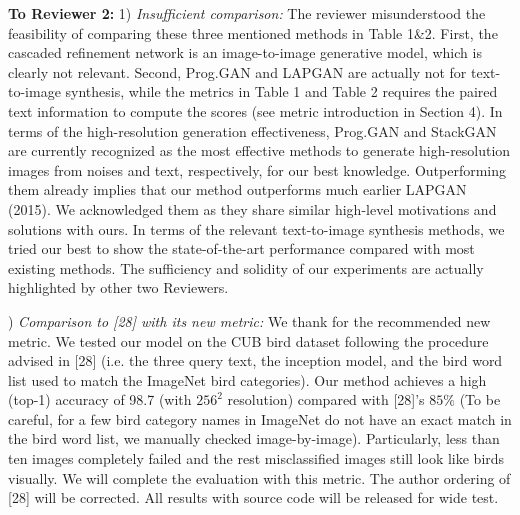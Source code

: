 \documentclass[10pt,twocolumn,letterpaper]{article}
\begin{document}
\noindent
\textbf{To Reviewer 2:} 1) \textit{Insufficient comparison: } The reviewer misunderstood the feasibility of comparing these three mentioned methods in Table 1\&2. First, the cascaded refinement network is an image-to-image generative model, which is clearly not relevant.  
Second, Prog.GAN and LAPGAN are actually not for text-to-image synthesis, while the metrics in Table 1 and Table 2 requires the paired text information to compute the scores (see metric introduction in Section 4).
In terms of the high-resolution generation effectiveness, 
Prog.GAN and StackGAN are currently recognized as the most effective methods to generate high-resolution images from noises and text, respectively, for our best knowledge. Outperforming them already implies that our method outperforms much earlier LAPGAN (2015). We acknowledged them as they share similar high-level motivations and solutions with ours.  
In terms of the relevant text-to-image synthesis methods,  
we tried our best to show the state-of-the-art performance compared with most existing methods. The sufficiency and solidity of our experiments are actually highlighted by other two Reviewers. 


) \textit{Comparison to [28] with its new metric: } We thank for the recommended new metric. We tested our model on the CUB bird dataset following the procedure advised in [28] (i.e. the three query text, the inception model, and the bird word list used to match the ImageNet bird categories). Our method achieves a high (top-1) accuracy of 98.7 (with $256^2$ resolution) compared with [28]'s $85\%$ (To be careful, for a few bird category names in ImageNet do not have an exact match in the bird word list, we manually checked image-by-image). Particularly, less than ten images completely failed and the rest misclassified images still look like birds visually. We will complete the evaluation with this metric. The author ordering of [28] will be corrected. All results with source code will be released for wide test. 
\end{document}
